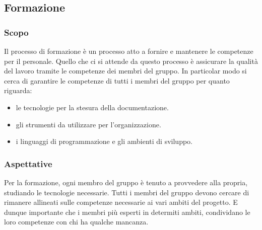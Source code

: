\subsection{Formazione}
\subsubsection{Scopo}
Il processo di formazione è un processo atto a fornire e mantenere le competenze per il personale. Quello che ci si attende da questo processo è assicurare la qualità del lavoro tramite le competenze dei membri del gruppo. 
In particolar modo si cerca di garantire le competenze di tutti i membri del gruppo per quanto riguarda:
\begin{itemize}
	\item le tecnologie per la stesura della documentazione.
	\item gli strumenti da utilizzare per l'organizzazione.
	\item i linguaggi di programmazione e gli ambienti di sviluppo.
\end{itemize}
\subsubsection{Aspettative}
Per la formazione, ogni membro del gruppo è tenuto a provvedere alla propria, studiando le tecnologie necessarie. Tutti i membri del gruppo devono cercare di rimanere allineati sulle competenze necessarie ai vari ambiti del progetto. E dunque importante che i membri più esperti in determiti ambiti, condividano le loro competenze con chi ha qualche mancanza.

